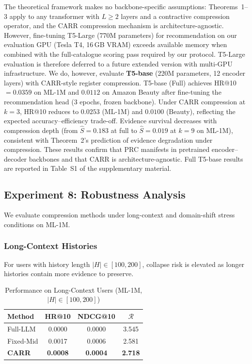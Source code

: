 \documentclass[lettersize,journal]{IEEEtran}
\begin{document}
The theoretical framework makes no backbone-specific assumptions: Theorems~1--3 apply to any transformer with $L \geq 2$ layers and a contractive compression operator, and the CARR compression mechanism is architecture-agnostic. However, fine-tuning T5-Large (770M parameters) for recommendation on our evaluation GPU (Tesla T4, 16\,GB VRAM) exceeds available memory when combined with the full-catalogue scoring pass required by our protocol. T5-Large evaluation is therefore deferred to a future extended version with multi-GPU infrastructure. We do, however, evaluate \textbf{T5-base} (220M parameters, 12 encoder layers) with CARR-style register compression. T5-base (Full) achieves HR@10$=0.0359$ on ML-1M and $0.0112$ on Amazon Beauty after fine-tuning the recommendation head (3 epochs, frozen backbone). Under CARR compression at $k=3$, HR@10 reduces to $0.0253$ (ML-1M) and $0.0100$ (Beauty), reflecting the expected accuracy--efficiency trade-off. Evidence survival decreases with compression depth (from $\widehat{S}=0.183$ at full to $\widehat{S}=0.019$ at $k=9$ on ML-1M), consistent with Theorem~2's prediction of evidence degradation under compression. These results confirm that PRC manifests in pretrained encoder--decoder backbones and that CARR is architecture-agnostic. Full T5-base results are reported in Table~S1 of the supplementary material.

\subsection{Experiment 8: Robustness Analysis}

We evaluate compression methods under long-context and domain-shift stress conditions on ML-1M.

\subsubsection{Long-Context Histories}
For users with history length $|H| \in [100, 200]$, collapse risk is elevated as longer histories contain more evidence to preserve.

\begin{table}[!t]
\caption{Performance on Long-Context Users (ML-1M, $|H| \in [100, 200]$)\label{tab:long}}
\centering
\begin{tabular}{l|ccc}
\toprule
\textbf{Method} & HR@10 & NDCG@10 & $\mathcal{R}$ \\
\midrule
Full-LLM & 0.0000 & 0.0000 & 3.545 \\
Fixed-Mid & 0.0017 & 0.0006 & 2.581 \\
\textbf{CARR} & \textbf{0.0008} & \textbf{0.0004} & \textbf{2.718} \\
\bottomrule
\end{tabular}
\end{table}
\end{document}
